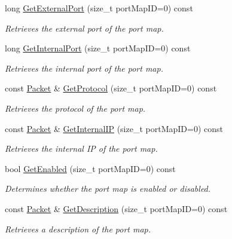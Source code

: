 \begin{DoxyCompactItemize}
long \hyperlink{class_upnp_nat_port_map_action_a801e724031df769525baeb7bc2985d08}{GetExternalPort} (size\_\-t portMapID=0) const 
\begin{DoxyCompactList}\small\item\em Retrieves the external port of the port map. \item\end{DoxyCompactList}\item 
long \hyperlink{class_upnp_nat_port_map_action_afb999d6a4ddbce544237cda8875b5378}{GetInternalPort} (size\_\-t portMapID=0) const 
\begin{DoxyCompactList}\small\item\em Retrieves the internal port of the port map. \item\end{DoxyCompactList}\item 
const \hyperlink{class_packet}{Packet} \& \hyperlink{class_upnp_nat_port_map_action_a0227dfe29646e9518c4d6be4462c278a}{GetProtocol} (size\_\-t portMapID=0) const 
\begin{DoxyCompactList}\small\item\em Retrieves the protocol of the port map. \item\end{DoxyCompactList}\item 
const \hyperlink{class_packet}{Packet} \& \hyperlink{class_upnp_nat_port_map_action_a013577f0208bd9ed306d0bdd417d5245}{GetInternalIP} (size\_\-t portMapID=0) const 
\begin{DoxyCompactList}\small\item\em Retrieves the internal IP of the port map. \item\end{DoxyCompactList}\item 
bool \hyperlink{class_upnp_nat_port_map_action_afbb7ab4b169cdda526f5379dd40f18ab}{GetEnabled} (size\_\-t portMapID=0) const 
\begin{DoxyCompactList}\small\item\em Determines whether the port map is enabled or disabled. \item\end{DoxyCompactList}\item 
const \hyperlink{class_packet}{Packet} \& \hyperlink{class_upnp_nat_port_map_action_a2e49350f5d402efbe6f3495ef1389a69}{GetDescription} (size\_\-t portMapID=0) const 
\begin{DoxyCompactList}\small\item\em Retrieves a description of the port map. \item\end{DoxyCompactList}\end{DoxyCompactItemize}
